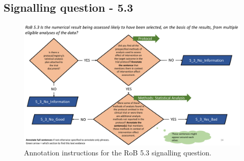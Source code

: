 \documentclass[sn-mathphys,Numbered]{sn-jnl}%
\begin{document}
\subsection*{Signalling question - 5.3 }
%
\begin{figure}[htbp]
    \centering
    \includegraphics[width=\textwidth]{figures/5_3.pdf}
    \caption{Annotation instructions for the RoB 5.3 signalling question.}
    \label{fig:5_3}
\end{figure}
%
%
%
%
\end{document}
